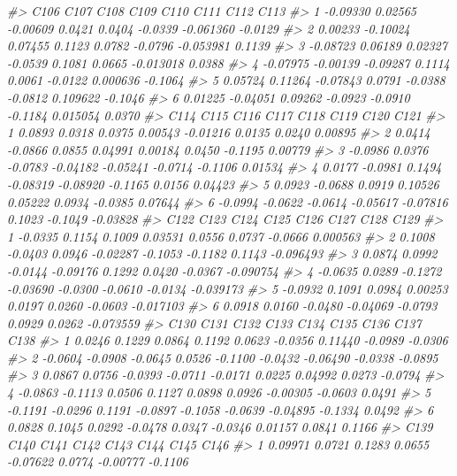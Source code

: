 \documentclass[]{book}
\newenvironment{Shaded}{\begin{snugshade}}{\end{snugshade}}
\newcommand{\CommentTok}[1]{\textcolor[rgb]{0.56,0.35,0.01}{\textit{#1}}}
\begin{document}
\begin{Shaded}
\begin{Highlighting}[]
{{{{{\CommentTok{#>       C106     C107     C108    C109    C110    C111      C112    C113}
\CommentTok{#> 1 -0.09330  0.02565 -0.00609  0.0421  0.0404 -0.0339 -0.061360 -0.0129}
\CommentTok{#> 2  0.00233 -0.10024  0.07455  0.1123  0.0782 -0.0796 -0.053981  0.1139}
\CommentTok{#> 3 -0.08723  0.06189  0.02327 -0.0539  0.1081  0.0665 -0.013018  0.0388}
\CommentTok{#> 4 -0.07975 -0.00139 -0.09287  0.1114  0.0061 -0.0122  0.000636 -0.1064}
\CommentTok{#> 5  0.05724  0.11264 -0.07843  0.0791 -0.0388 -0.0812  0.109622 -0.1046}
\CommentTok{#> 6  0.01225 -0.04051  0.09262 -0.0923 -0.0910 -0.1184  0.015054  0.0370}
\CommentTok{#>      C114    C115    C116     C117     C118    C119    C120     C121}
\CommentTok{#> 1  0.0893  0.0318  0.0375  0.00543 -0.01216  0.0135  0.0240  0.00895}
\CommentTok{#> 2  0.0414 -0.0866  0.0855  0.04991  0.00184  0.0450 -0.1195  0.00779}
\CommentTok{#> 3 -0.0986  0.0376 -0.0783 -0.04182 -0.05241 -0.0714 -0.1106  0.01534}
\CommentTok{#> 4  0.0177 -0.0981  0.1494 -0.08319 -0.08920 -0.1165  0.0156  0.04423}
\CommentTok{#> 5  0.0923 -0.0688  0.0919  0.10526  0.05222  0.0934 -0.0385  0.07644}
\CommentTok{#> 6 -0.0994 -0.0622 -0.0614 -0.05617 -0.07816  0.1023 -0.1049 -0.03828}
\CommentTok{#>      C122    C123    C124     C125    C126    C127    C128      C129}
\CommentTok{#> 1 -0.0335  0.1154  0.1009  0.03531  0.0556  0.0737 -0.0666  0.000563}
\CommentTok{#> 2  0.1008 -0.0403  0.0946 -0.02287 -0.1053 -0.1182  0.1143 -0.096493}
\CommentTok{#> 3  0.0874  0.0992 -0.0144 -0.09176  0.1292  0.0420 -0.0367 -0.090754}
\CommentTok{#> 4 -0.0635  0.0289 -0.1272 -0.03690 -0.0300 -0.0610 -0.0134 -0.039173}
\CommentTok{#> 5 -0.0932  0.1091  0.0984  0.00253  0.0197  0.0260 -0.0603 -0.017103}
\CommentTok{#> 6  0.0918  0.0160 -0.0480 -0.04069 -0.0793  0.0929  0.0262 -0.073559}
\CommentTok{#>      C130    C131    C132    C133    C134    C135     C136    C137    C138}
\CommentTok{#> 1  0.0246  0.1229  0.0864  0.1192  0.0623 -0.0356  0.11440 -0.0989 -0.0306}
\CommentTok{#> 2 -0.0604 -0.0908 -0.0645  0.0526 -0.1100 -0.0432 -0.06490 -0.0338 -0.0895}
\CommentTok{#> 3  0.0867  0.0756 -0.0393 -0.0711 -0.0171  0.0225  0.04992  0.0273 -0.0794}
\CommentTok{#> 4 -0.0863 -0.1113  0.0506  0.1127  0.0898  0.0926 -0.00305 -0.0603  0.0491}
\CommentTok{#> 5 -0.1191 -0.0296  0.1191 -0.0897 -0.1058 -0.0639 -0.04895 -0.1334  0.0492}
\CommentTok{#> 6  0.0828  0.1045  0.0292 -0.0478  0.0347 -0.0346  0.01157  0.0841  0.1166}
\CommentTok{#>       C139    C140    C141    C142     C143   C144     C145    C146}
\CommentTok{#> 1  0.09971  0.0721  0.1283  0.0655 -0.07622 0.0774 -0.00777 -0.1106}
}}}}}
\end{Highlighting}
\end{Shaded}
\end{document}

